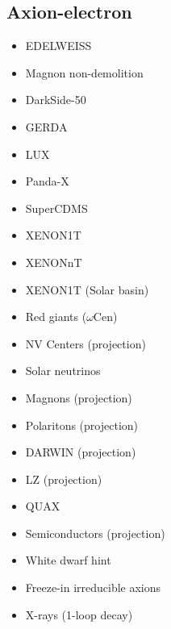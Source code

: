 \documentclass[8pt,twocolumn]{extarticle}
\begin{document}
\begin{mdframed}
\vspace{-1em}
\section{Axion-electron}\vspace{-0.5em}
\begin{itemize}\setlength\itemsep{-0.5em}
    \item EDELWEISS~\cite{EDELWEISS:2018tde}
    \item Magnon non-demolition~\cite{Ikeda:2021mlv}
    \item DarkSide-50~\cite{DarkSide:2022knj}
    \item GERDA~\cite{GERDA:2020emj}
    \item LUX~\cite{LUX:2017glr}
    \item Panda-X~\cite{PandaX:2017ock}
    \item SuperCDMS~\cite{SuperCDMS:2019jxx}
    \item XENON1T~\cite{XENON:2019gfn,XENON:2020rca}
    \item XENONnT~\cite{XENONCollaboration:2022kmb}
    \item XENON1T (Solar basin)~\cite{VanTilburg:2020jvl}
    \item Red giants ($\omega$Cen)~\cite{Capozzi:2020cbu}
	\item NV Centers (projection)~\cite{Chigusa:2023hms}
    \item Solar neutrinos~\cite{Gondolo:2008dd}
    \item Magnons (projection)~\cite{Chigusa:2020gfs}
        \item Polaritons (projection)~\cite{Mitridate:2020kly}
    \item DARWIN (projection)~\cite{DARWIN:2016hyl}
    \item LZ (projection)~\cite{LZ:2021xov}
    \item QUAX~\cite{Crescini:2018qrz,QUAX:2020adt}
  	\item Semiconductors (projection)~\cite{Bloch:2016sjj}
  	\item White dwarf hint~\cite{Giannotti:2017hny}
  	\item Freeze-in irreducible axions~\cite{Langhoff:2022bij}
  	\item X-rays (1-loop decay)~\cite{Ferreira:2022egk}
\end{itemize}
\end{mdframed}
\end{document}
